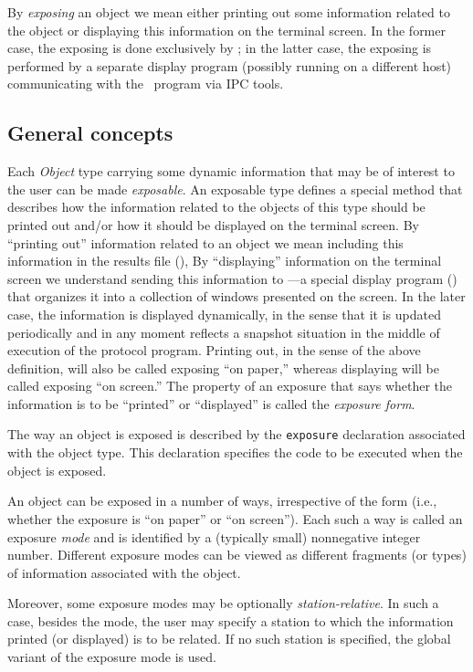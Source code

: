 By {\em exposing\/} an object we mean either printing out some information
related to the object or displaying this information on the terminal
screen.
In the former case, the exposing is done exclusively by \smurph; in the
latter case, the exposing is performed by a separate
display program (possibly running on a different host)
communicating with the \smurph\ program via IPC tools.

\subsection{General concepts}
\label{rm_ex_gc}

Each {\em Object\/} type
carrying some dynamic information that may be of interest
to the user can be made {\em exposable}.
An exposable type defines a special method that describes how the
information related to the objects of this type
should be printed out and/or how it
should be displayed on the terminal screen.
By ``printing out'' information related to an object we mean
including this information in the results file (),
By ``displaying'' information on the terminal screen we understand
sending this information to \dsd---a special
display program () that organizes it into a
collection of windows presented on the screen.
In the later case, the information is displayed dynamically, in the sense
that it is updated periodically and in any moment reflects a snapshot
situation in the middle of execution of the protocol program.
Printing out, in the sense of the above definition, will also be called
exposing ``on paper,'' whereas displaying
will be called exposing ``on screen.''
The property of an exposure that says whether the information is to be
``printed'' or ``displayed'' is called the {\em exposure form}.

The way an object is exposed is described by the {\tt exposure} declaration
associated with the object type.
This declaration specifies the code to be executed when the object is
exposed.

An object can be exposed in a number of ways, irrespective of the form (i.e.,
whether the exposure is ``on paper'' or ``on screen'').
Each such a way is called an exposure {\em mode\/} and is identified by
a (typically small) nonnegative integer number.
Different exposure modes can be viewed as different fragments (or types)
of information associated with the object.

Moreover, some exposure modes may be optionally {\em station-relative}.
In such a case, besides the mode, the user may specify a station to
which the information printed (or displayed) is to be related.
If no such station is specified, the global variant of the exposure
mode is used.

